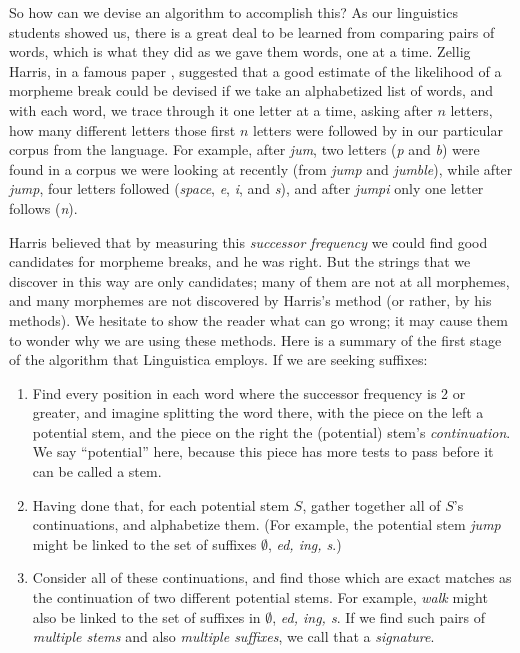 \documentclass[output=paper,colorlinks,citecolor=brown]{langscibook}
\begin{document}
So how can we devise an algorithm to accomplish this? As our linguistics students showed us, there is a great deal to be learned from comparing pairs of words, which is what they did as we gave them words, one at a time. Zellig Harris, in a famous paper \citep{Harris1955}, suggested that a good estimate of the likelihood of a morpheme break could be devised if we take an alphabetized list of words, and with each word, we trace through it one letter at a time, asking after $n$ letters, how many different letters  those first $n$ letters were followed by in our particular corpus from the language. For example, after \textit{jum}, two letters (\textit{p} and \textit{b}) were found in a corpus we were looking at recently (from \textit{jump} and \textit{jumble}), while after \textit{jump}, four letters followed (\textit{space}, \textit{e}, \textit{i}, and \textit{s}), and after \textit{jumpi} only one letter follows (\textit{n}).

Harris believed that by measuring this \textit{successor frequency} we could find good candidates for morpheme breaks, and he was right. But the strings that we discover in this way are only candidates; many of them are not at all morphemes, and many morphemes are not discovered by Harris's method (or rather, by his methods). We hesitate to show the reader what can go wrong; it may cause them to wonder why we are using these methods. Here is a summary of the first stage of the algorithm that Linguistica employs. If we are seeking suffixes:
\begin{enumerate}
\item  Find every position in each word where the successor frequency is 2 or greater, and imagine splitting the word there, with the piece on the left a potential stem, and the piece on the right the (potential) stem's \textit{continuation}. We say ``potential'' here, because this piece has more tests to pass before it can be called a stem.

\item  Having done that, for each potential stem $S$, gather together all of $S$'s continuations, and alphabetize them. (For example, the potential stem \textit{jump} might be linked to the set of suffixes $\emptyset$, \textit{ed, ing, s}.) 

\item   Consider all of these continuations, and find those which are exact matches as the continuation of two different potential stems. For example, \textit{walk} might also be linked to the set of suffixes in $\emptyset$, \textit{ed, ing, s}. If we find such pairs of \textit{multiple stems} and also \textit{multiple suffixes}, we call that a \textit{signature}.
\end{enumerate}
\end{document}

